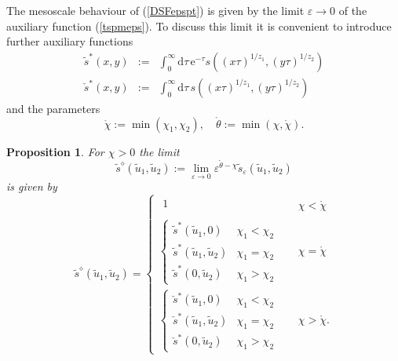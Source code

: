 \documentclass[12pt]{article}
\newcommand{\rmd}{\mathrm{d}}
\newcommand{\rme}{\mathrm{e}}
\newtheorem{proposition}[theorem]{Proposition}
\begin{document}
The mesoscale behaviour of (\ref{DSFepspt}) is given by the 
limit $\varepsilon\to 0$ of the auxiliary function (\ref{tspmeps}). 
To discuss this limit it is convenient to
introduce further auxiliary functions
\begin{eqnarray}
\tilde{s}^\ast(x,y) & := &
\int_{0}^\infty \rmd \tau \, \rme^{- \tau}
s ((x \tau)^{1/z_1}, (y \tau)^{1/z_2}) 
\label{tspm} \\
\check{s}^\ast(x,y) & := & \int_{0}^\infty \rmd \tau \, s ((x \tau)^{1/z_1}, (y \tau)^{1/z_2}) 
\label{cspm}
\end{eqnarray}
and the parameters
\begin{equation}
\mathring{\chi} := \min{(\chi_1,\chi_2)}, \quad 
\mathring{\theta} := \min{(\chi,\mathring{\chi})}.
\label{ringchidef}
\end{equation}



\begin{proposition}
\label{Prop:1}
For $\chi>0$
the limit
\begin{equation}
\tilde{s}^{\diamond}(\tilde{u}_1,\tilde{u}_2) 
:=  \lim_{\varepsilon \to 0} \varepsilon^{\mathring{\theta}-\chi} 
\tilde{s}_{\varepsilon}(\tilde{u}_1,\tilde{u}_2) 
\label{tsbulldef}
\end{equation}
is given by
\begin{equation}
\tilde{s}^{\diamond}(\tilde{u}_1,\tilde{u}_2)
= \left\{
\begin{array}{ll}
\begin{array}{ll}
1 &  \\
\end{array}  & \quad \chi < \mathring{\chi} \\[2mm]
\left\{
\begin{array}{ll}
\tilde{s}^\ast
(\tilde{u}_1,0) & \chi_1 < \chi_2\\
\tilde{s}^\ast
(\tilde{u}_1,\tilde{u}_2) & \chi_1 = \chi_2 \\
\tilde{s}^\ast
(0,\tilde{u}_2) & \chi_1 > \chi_2
\end{array} \right. & \quad \chi = \mathring{\chi}  \\[6mm]
\left\{
\begin{array}{ll}
\check{s}^\ast
(\tilde{u}_1,0) & \chi_1 < \chi_2 \\
\check{s}^\ast
(\tilde{u}_1,\tilde{u}_2) & \chi_1 = \chi_2 \\
\check{s}^\ast
(0,\tilde{u}_2) & \chi_1 > \chi_2 
\end{array} \right.  & \quad \chi > \mathring{\chi}.
\end{array} \right. 
\end{equation}
\end{proposition}
\end{document}
